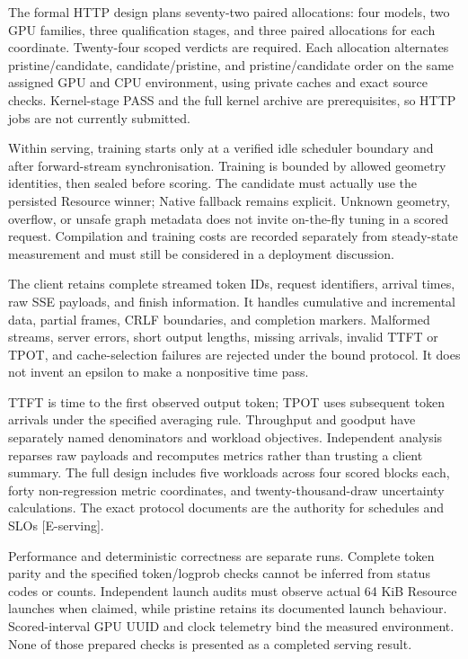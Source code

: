 \documentclass[11pt,a4paper]{article}
\begin{document}
The formal HTTP design plans seventy-two paired allocations: four models, two GPU families, three qualification stages, and three paired allocations for each coordinate. Twenty-four scoped verdicts are required. Each allocation alternates pristine/\allowbreak{}candidate, candidate/\allowbreak{}pristine, and pristine/\allowbreak{}candidate order on the same assigned GPU and CPU environment, using private caches and exact source checks. Kernel-stage PASS and the full kernel archive are prerequisites, so HTTP jobs are not currently submitted.


Within serving, training starts only at a verified idle scheduler boundary and after forward-stream synchronisation. Training is bounded by allowed geometry identities, then sealed before scoring. The candidate must actually use the persisted Resource winner; Native fallback remains explicit. Unknown geometry, overflow, or unsafe graph metadata does not invite on-the-fly tuning in a scored request. Compilation and training costs are recorded separately from steady-state measurement and must still be considered in a deployment discussion.


The client retains complete streamed token IDs, request identifiers, arrival times, raw SSE payloads, and finish information. It handles cumulative and incremental data, partial frames, CRLF boundaries, and completion markers. Malformed streams, server errors, short output lengths, missing arrivals, invalid TTFT or TPOT, and cache-selection failures are rejected under the bound protocol. It does not invent an epsilon to make a nonpositive time pass.


TTFT is time to the first observed output token; TPOT uses subsequent token arrivals under the specified averaging rule. Throughput and goodput have separately named denominators and workload objectives. Independent analysis reparses raw payloads and recomputes metrics rather than trusting a client summary. The full design includes five workloads across four scored blocks each, forty non-regression metric coordinates, and twenty-thousand-draw uncertainty calculations. The exact protocol documents are the authority for schedules and SLOs [E-serving].


Performance and deterministic correctness are separate runs. Complete token parity and the specified token/\allowbreak{}logprob checks cannot be inferred from status codes or counts. Independent launch audits must observe actual 64 KiB Resource launches when claimed, while pristine retains its documented launch behaviour. Scored-interval GPU UUID and clock telemetry bind the measured environment. None of those prepared checks is presented as a completed serving result.
\end{document}
